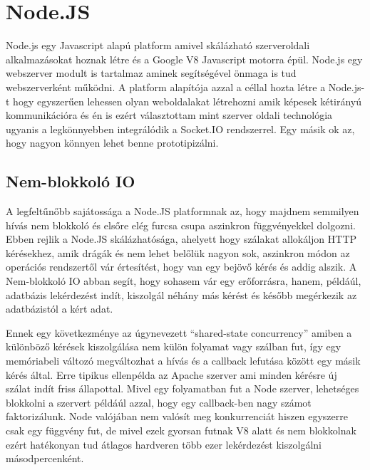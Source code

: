 \section{Node.JS}

Node.js egy Javascript alapú platform amivel skálázható szerveroldali alkalmazásokat hoznak létre és a Google V8 Javascript motorra épül. Node.js egy webszerver modult is tartalmaz aminek segítségével önmaga is tud webszerverként működni. A platform alapítója azzal a céllal hozta létre a Node.js-t hogy egyszerűen lehessen olyan weboldalakat létrehozni amik képesek kétirányú kommunikációra és én is ezért választottam mint szerver oldali technológia ugyanis a legkönnyebben integrálódik a Socket.IO rendszerrel.  Egy másik ok az, hogy nagyon könnyen lehet benne prototipizálni.



\subsection{Nem-blokkoló IO}

A legfeltűnőbb sajátossága a Node.JS platformnak az, hogy majdnem semmilyen hívás nem blokkoló és elsőre elég furcsa csupa aszinkron függvényekkel dolgozni. Ebben rejlik a Node.JS skálázhatósága, ahelyett hogy szálakat allokáljon HTTP kérésekhez, amik drágák és nem lehet belőlük nagyon sok, aszinkron módon az operációs rendszertől vár értesítést, hogy van egy bejövő kérés és addig alszik. A Nem-blokkoló IO abban segít, hogy sohasem vár egy erőforrásra, hanem, példáúl, adatbázis lekérdezést indít, kiszolgál néhány más kérést és később megérkezik az adatbázistól a kért adat. 

Ennek egy következménye az úgynevezett ``shared-state concurrency'' amiben a különböző kérések kiszolgálása nem külön folyamat vagy szálban fut, így egy memóriabeli változó megváltozhat a hívás és a callback lefutása között egy másik kérés által. Erre tipikus ellenpélda az Apache szerver ami minden kérésre új szálat indít friss állapottal. Mivel egy folyamatban fut a Node szerver, lehetséges blokkolni a szervert példáúl azzal, hogy egy callback-ben nagy számot faktorizálunk. Node valójában nem valósít meg konkurrenciát hiszen egyszerre csak egy függvény fut, de mivel ezek gyorsan futnak V8 alatt és nem blokkolnak ezért hatékonyan tud átlagos hardveren több ezer lekérdezést kiszolgálni másodpercenként\cite{nodebook}.

